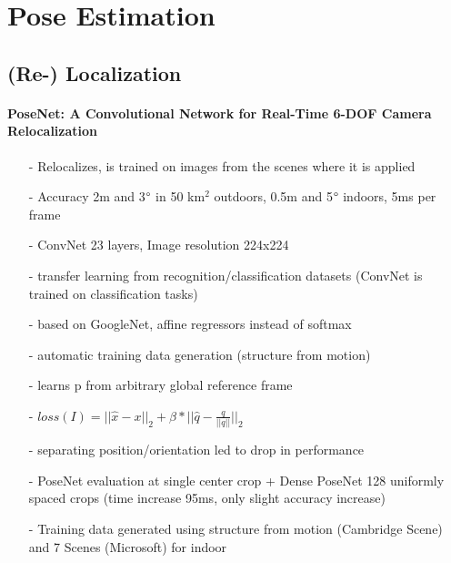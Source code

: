 \section{Pose Estimation}
\label{sec:bg:pose_estimation}
	\subsection{(Re-) Localization}
	\paragraph{PoseNet: A Convolutional Network for Real-Time 6-DOF Camera Relocalization \cite{Kendall}}
	\begin{itemize}
		\item[-] Relocalizes, is trained on images from the scenes where it is applied	\item[-] Accuracy 2m and 3$\degree$  in 50 km$^2$ outdoors, 0.5m and 5$\degree$ indoors, 5ms per frame
		\item[-] ConvNet 23 layers, Image resolution 224x224
		\item[-] transfer learning from recognition/classification datasets (ConvNet is trained on classification tasks)
		\item[-] based on GoogleNet, affine regressors instead of softmax\item[-] automatic training data generation (structure from motion)
		\item[-] learns p from arbitrary global reference frame
		\item[-] $loss(I) = || \hat{x}-x||_2 + \beta*||\hat{q}-\frac{q}{||q||}||_2$
		\item[-] separating position/orientation led to drop in performance
		\item[-] PoseNet evaluation at single center crop + Dense PoseNet 128 uniformly spaced crops (time increase 95ms, only slight accuracy increase)
		\item[-] Training data generated using structure from motion (Cambridge Scene) and 7 Scenes (Microsoft) for indoor
		
	\end{itemize}
